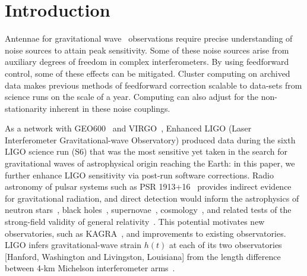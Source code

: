     \section{Introduction}
    \label{introduction}


Antennae for gravitational wave~\cite{Thorne300} observations require precise understanding of noise sources to attain peak sensitivity. Some of these noise sources arise from auxiliary degrees of freedom in complex interferometers. By using feedforward control, some of these effects can be mitigated. Cluster computing on archived data makes previous methods of feedforward correction scalable to data-sets from science runs on the scale of a year. Computing can also adjust for the non-stationarity inherent in these noise couplings.

	As a network with GEO600~\cite{Willke2002,Hild2009} and VIRGO~\cite{Acernese2005}, Enhanced LIGO (Laser Interferometer Gravitational-wave Observatory) \cite{LIGOFirst2004,Fricke2009} produced data during the sixth LIGO science run (S6) that was the most sensitive yet taken in the search for gravitational waves of astrophysical origin reaching the Earth: in this paper, we further enhance LIGO sensitivity via post-run software corrections. Radio astronomy of pulsar systems such as PSR 1913+16~\cite{HulseTaylor1975} provides indirect evidence for gravitational radiation, and direct detection would inform the astrophysics of neutron stars~\cite{Lindblom1995,AbbottPulsar2006}, black holes~\cite{Sathyaprakash2009}, supernovae~\cite{Chandrasekhar1969,Ott2009}, cosmology~\cite{Grishchuk1974}, and related tests of the strong-field validity of general relativity~\cite{Riles2013}. This potential motivates new observatories, such as KAGRA~\cite{Kuroda2010}, and improvements to existing observatories. LIGO infers gravitational-wave strain $h(t)$ at each of its two observatories [Hanford, Washington and Livingston, Louisiana] from the length difference between 4-km Michelson interferometer arms~\cite{Saulson}. 

